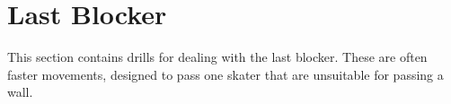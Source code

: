\section*{Last Blocker}
\label{section:last_blocker}

This section contains drills for dealing with the last blocker. 
These are often faster movements, designed to pass one skater that are unsuitable for passing a wall.



